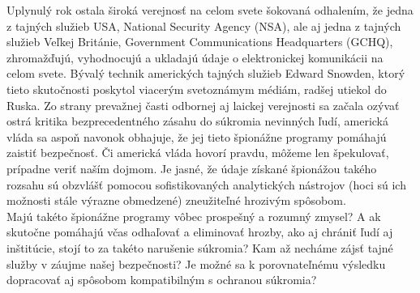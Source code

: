 \documentclass{article}
\begin{document}
\begin{flushleft}
\bigskip

\setlength{\parindent}{1,25cm}

Uplynulý rok ostala široká verejnosť na celom svete šokovaná odhalením, že jedna z tajných služieb USA, National Security Agency (NSA), ale aj jedna z tajných služieb Veľkej Británie, Government Communications Headquarters (GCHQ), zhromažďujú, vyhodnocujú a ukladajú údaje o elektronickej komunikácii na celom svete. Bývalý technik amerických tajných služieb Edward Snowden, ktorý tieto skutočnosti poskytol viacerým svetoznámym médiám, radšej utiekol do Ruska. Zo strany prevažnej časti odbornej aj laickej verejnosti sa začala ozývať ostrá kritika bezprecedentného zásahu do súkromia nevinných ľudí, americká vláda sa aspoň navonok obhajuje, že jej tieto špionážne programy pomáhajú zaistiť bezpečnosť. Či americká vláda hovorí pravdu, môžeme len špekulovať, prípadne veriť naším dojmom. Je jasné, že údaje získané špionážou takého rozsahu sú obzvlášť pomocou sofistikovaných analytických nástrojov (hoci sú ich možnosti stále výrazne obmedzené) zneužiteľné hrozivým spôsobom.\\
Majú takéto špionážne programy vôbec prospešný a rozumný zmysel? A ak skutočne pomáhajú včas odhaľovať a eliminovať hrozby, ako aj chrániť ľudí aj inštitúcie, stojí to za takéto narušenie súkromia? Kam až necháme zájsť tajné služby v záujme našej bezpečnosti? Je možné sa k porovnateľnému výsledku dopracovať aj spôsobom kompatibilným s ochranou súkromia?\\

\end{flushleft}
\end{document}
